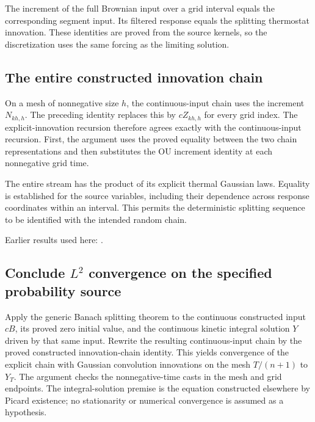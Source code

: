 \documentclass[11pt,a4paper]{report}
\begin{document}
The increment of the full Brownian input over a grid interval equals the corresponding segment input. Its filtered response equals the splitting thermostat innovation. These identities are proved from the source kernels, so the discretization uses the same forcing as the limiting solution.

\subsection{\texorpdfstring{The entire constructed innovation chain}{The entire constructed innovation chain}}
\label{report-step-KineticLangevin-CanonicalSplitting-lean-4}


On a mesh of nonnegative size \(h\), the continuous-input chain uses the increment \(N_{kh,h}\). The preceding identity replaces this by \(cZ_{kh,h}\) for every grid index. The explicit-innovation recursion therefore agrees exactly with the continuous-input recursion. First, the argument uses the proved equality between the two chain representations and then substitutes the OU increment identity at each nonnegative grid time.



The entire stream has the product of its explicit thermal Gaussian laws. Equality is established for the source variables, including their dependence across response coordinates within an interval. This permits the deterministic splitting sequence to be identified with the intended random chain.



Earlier results used here: \cite[Section~3.8.17]{LangevinLean2026ULASC}.
\subsection{\texorpdfstring{Conclude \(L^{2}\) convergence on the specified probability source}{Conclude L² convergence on the specified probability source}}
\label{report-step-KineticLangevin-CanonicalSplitting-lean-5}


Apply the generic Banach splitting theorem to the continuous constructed input \(cB\), its proved zero initial value, and the continuous kinetic integral solution \(Y\) driven by that same input. Rewrite the resulting continuous-input chain by the proved constructed innovation-chain identity. This yields convergence of the explicit chain with Gaussian convolution innovations on the mesh \(T/(n+1)\) to \(Y_T\). The argument checks the nonnegative-time casts in the mesh and grid endpoints. The integral-solution premise is the equation constructed elsewhere by Picard existence; no stationarity or numerical convergence is assumed as a hypothesis.
\end{document}
